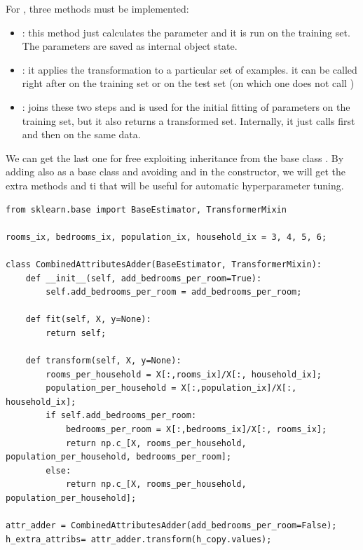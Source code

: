 For , three methods must be implemented:
\begin{itemize}
\item{}: this method just calculates the parameter and it is run on the training set. The parameters are saved as internal object state.
\item {}: it applies the transformation to a particular set of examples. it can be called right after  on the training set or on the test set (on which one does not call )
\item {}: joins these two steps and is used for the initial fitting of parameters on the training set, but it also returns a transformed set. Internally, it just calls first  and then  on the same data.
\end{itemize}
We can get the last one for free exploiting inheritance from the base class . By adding also  as a base class and avoiding \ti{} and \ti{} in the constructor, we will get the extra methods \ti{} and ti that will be useful for automatic hyperparameter tuning.

\begin{lstlisting}[caption=Example of how to create a custom transformer.]
from sklearn.base import BaseEstimator, TransformerMixin

rooms_ix, bedrooms_ix, population_ix, household_ix = 3, 4, 5, 6;

class CombinedAttributesAdder(BaseEstimator, TransformerMixin):
    def __init__(self, add_bedrooms_per_room=True):
        self.add_bedrooms_per_room = add_bedrooms_per_room;

    def fit(self, X, y=None):
        return self;
    
    def transform(self, X, y=None):
        rooms_per_household = X[:,rooms_ix]/X[:, household_ix];
        population_per_household = X[:,population_ix]/X[:, household_ix];
        if self.add_bedrooms_per_room:
            bedrooms_per_room = X[:,bedrooms_ix]/X[:, rooms_ix];
            return np.c_[X, rooms_per_household, population_per_household, bedrooms_per_room];
        else:
            return np.c_[X, rooms_per_household, population_per_household];
        
attr_adder = CombinedAttributesAdder(add_bedrooms_per_room=False);
h_extra_attribs= attr_adder.transform(h_copy.values);
\end{lstlisting}

